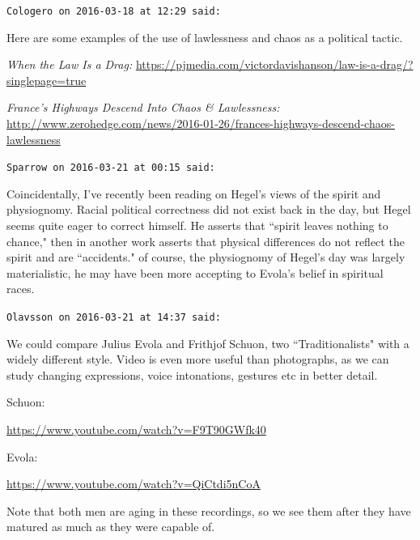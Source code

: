 \begin{footnotesize}\begin{sffamily}



\texttt{Cologero on 2016-03-18 at 12:29 said: }

Here are some examples of the use of lawlessness and chaos as a political tactic.

\textit{When the Law Is a Drag:} \url{https://pjmedia.com/victordavishanson/law-is-a-drag/?singlepage=true}

\textit{France's Highways Descend Into Chaos \& Lawlessness:} \url{http://www.zerohedge.com/news/2016-01-26/frances-highways-descend-chaos-lawlessness}


\hfill

\texttt{Sparrow on 2016-03-21 at 00:15 said: }

Coincidentally, I've recently been reading on Hegel's views of the spirit and physiognomy. Racial political correctness did not exist back in the day, but Hegel seems quite eager to correct himself. He asserts that ``spirit leaves nothing to chance," then in another work asserts that physical differences do not reflect the spirit and are ``accidents." of course, the physiognomy of Hegel's day was largely materialistic, he may have been more accepting to Evola's belief in spiritual races.


\hfill

\texttt{Olavsson on 2016-03-21 at 14:37 said: }

We could compare Julius Evola and Frithjof Schuon, two ``Traditionalists" with a widely different style. Video is even more useful than photographs, as we can study changing expressions, voice intonations, gestures etc in better detail.

Schuon:

\url{https://www.youtube.com/watch?v=F9T90GWfk40}

Evola:

\url{https://www.youtube.com/watch?v=QiCtdi5nCoA}

Note that both men are aging in these recordings, so we see them after they have matured as much as they were capable of.


\end{sffamily}
\end{footnotesize}
